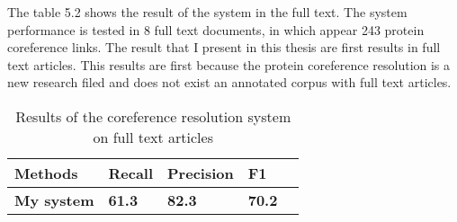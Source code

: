 The table 5.2 shows the result of the system in the full text. The system performance is tested in 8 full text documents, in which appear 243 protein coreference links. The result that I present in this thesis are first results in full text articles. This results are first because the protein coreference  resolution is a new research filed and  does not exist an annotated corpus with full text articles.   
\begin{table}[h] 
   \begin{center}
	 \begin{tabular}{l | C{1.7cm} C{2cm} C{1.7cm}  @{}m{0pt}@{} }
 		
  		Methods & Recall & Precision & F1 & \\ [1.1ex]
 		\hline
 		\textbf{My system} & \textbf{61.3} & \textbf{82.3} & \textbf{70.2}& \\ [1.1ex]
 		\hline  
 	\end{tabular}
  \end{center} 
  \caption{Results of the coreference resolution system on full text articles}
\end{table}

